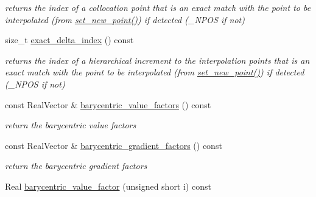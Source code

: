 \begin{DoxyCompactItemize}
\begin{DoxyCompactList}\small\item\em returns the index of a collocation point that is an exact match with the point to be interpolated (from \hyperlink{classPecos_1_1LagrangeInterpPolynomial_a676f72cadd45161151de088ca488af8a}{set\+\_\+new\+\_\+point()}) if detected (\+\_\+\+N\+P\+OS if not) \end{DoxyCompactList}\item 
size\+\_\+t \hyperlink{classPecos_1_1LagrangeInterpPolynomial_a90937bbedd0d5c002f5015cf3847cbaf}{exact\+\_\+delta\+\_\+index} () const \label{classPecos_1_1LagrangeInterpPolynomial_a90937bbedd0d5c002f5015cf3847cbaf}

\begin{DoxyCompactList}\small\item\em returns the index of a hierarchical increment to the interpolation points that is an exact match with the point to be interpolated (from \hyperlink{classPecos_1_1LagrangeInterpPolynomial_a676f72cadd45161151de088ca488af8a}{set\+\_\+new\+\_\+point()}) if detected (\+\_\+\+N\+P\+OS if not) \end{DoxyCompactList}\item 
const Real\+Vector \& \hyperlink{classPecos_1_1LagrangeInterpPolynomial_ab95f72f936b15b2f4cecde96d34d798c}{barycentric\+\_\+value\+\_\+factors} () const \label{classPecos_1_1LagrangeInterpPolynomial_ab95f72f936b15b2f4cecde96d34d798c}

\begin{DoxyCompactList}\small\item\em return the barycentric value factors \end{DoxyCompactList}\item 
const Real\+Vector \& \hyperlink{classPecos_1_1LagrangeInterpPolynomial_a1f77beaf45743dce80d8253b8f7a9394}{barycentric\+\_\+gradient\+\_\+factors} () const \label{classPecos_1_1LagrangeInterpPolynomial_a1f77beaf45743dce80d8253b8f7a9394}

\begin{DoxyCompactList}\small\item\em return the barycentric gradient factors \end{DoxyCompactList}\item 
Real \hyperlink{classPecos_1_1LagrangeInterpPolynomial_a72c4d54d2ef767ab8329f1fb67c7a3fe}{barycentric\+\_\+value\+\_\+factor} (unsigned short i) const \label{classPecos_1_1LagrangeInterpPolynomial_a72c4d54d2ef767ab8329f1fb67c7a3fe}


\end{DoxyCompactItemize}
